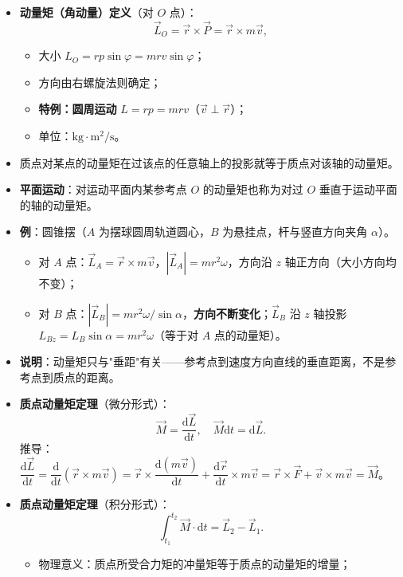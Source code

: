 \documentclass[12pt,a4paper]{ctexart}
\begin{document}
\begin{itemize}
    \item \textbf{动量矩（角动量）定义}（对 $O$ 点）：
    \[
        \vec{L}_O = \vec{r}\times\vec{P} = \vec{r}\times m\vec{v},
    \]
    \begin{itemize}
        \item 大小 $L_O = rp\sin\varphi = mrv\sin\varphi$；
        \item 方向由右螺旋法则确定；
        \item \textbf{特例：圆周运动} $L = rp = mrv$（$\vec{v}\perp\vec{r}$）；
        \item 单位：$\mathrm{kg\cdot m^2/s}$。
    \end{itemize}
    \item 质点对某点的动量矩在过该点的任意轴上的投影就等于质点对该轴的动量矩。
    \item \textbf{平面运动}：对运动平面内某参考点 $O$ 的动量矩也称为对过 $O$ 垂直于运动平面的轴的动量矩。
    \item \textbf{例}：圆锥摆（$A$ 为摆球圆周轨道圆心，$B$ 为悬挂点，杆与竖直方向夹角 $\alpha$）。
    \begin{itemize}
        \item 对 $A$ 点：$\vec{L}_A = \vec{r}\times m\vec{v}$，$|\vec{L}_A| = mr^2\omega$，方向沿 $z$ 轴正方向（大小方向均不变）；
        \item 对 $B$ 点：$|\vec{L}_B| = mr^2\omega/\sin\alpha$，\textbf{方向不断变化}；$\vec{L}_B$ 沿 $z$ 轴投影 $L_{Bz} = L_B\sin\alpha = mr^2\omega$（等于对 $A$ 点的动量矩）。
    \end{itemize}
    \item \textbf{说明}：动量矩只与"垂距"有关——参考点到速度方向直线的垂直距离，不是参考点到质点的距离。
    \item \textbf{质点动量矩定理}（微分形式）：
    \[
        \vec{M} = \frac{\mathrm{d}\vec{L}}{\mathrm{d}t},\quad \vec{M}\mathrm{d}t = \mathrm{d}\vec{L}.
    \]
    推导：$\dfrac{\mathrm{d}\vec{L}}{\mathrm{d}t} = \dfrac{\mathrm{d}}{\mathrm{d}t}(\vec{r}\times m\vec{v}) = \vec{r}\times\dfrac{\mathrm{d}(m\vec{v})}{\mathrm{d}t} + \dfrac{\mathrm{d}\vec{r}}{\mathrm{d}t}\times m\vec{v} = \vec{r}\times\vec{F} + \vec{v}\times m\vec{v} = \vec{M}$。
    \item \textbf{质点动量矩定理}（积分形式）：
    \[
        \int_{t_1}^{t_2}\vec{M}\cdot\mathrm{d}t = \vec{L}_2 - \vec{L}_1.
    \]
    \begin{itemize}
        \item 物理意义：质点所受合力矩的冲量矩等于质点的动量矩的增量；

\end{itemize}
\end{itemize}
\end{document}

